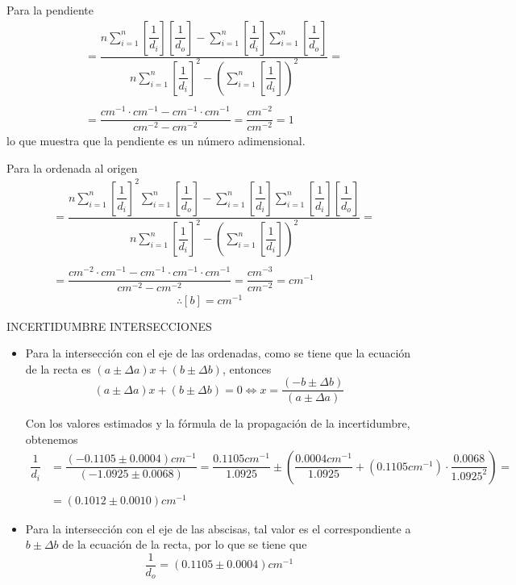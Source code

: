 \documentclass[a4paper, 10pt]{article}
\begin{document}
	Para la pendiente
	\begin{align*}
		[a]&=\dfrac{n\displaystyle\sum_{i=1}^{n}\left[\dfrac{1}{d_i}\right]\left[\dfrac{1}{d_o}\right]-\displaystyle\sum_{i=1}^{n}\left[\dfrac{1}{d_i}\right]\displaystyle\sum_{i=1}^{n}\left[\dfrac{1}{d_o}\right]}{n\displaystyle\sum_{i=1}^{n}\left[\dfrac{1}{d_i}\right]^2-\left(\displaystyle\sum_{i=1}^{n}\left[\dfrac{1}{d_i}\right]\right)^2}=\\\\
		&=\dfrac{cm^{-1}\cdot cm^{-1}-cm^{-1}\cdot cm^{-1}}{cm^{-2}-cm^{-2}}=\dfrac{cm^{-2}}{cm^{-2}}=1
	\end{align*}
	lo que muestra que la pendiente es un número adimensional. 
	
	Para la ordenada al origen
	\begin{align*}
		[b]&=\dfrac{n\displaystyle\sum_{i=1}^{n}\left[\dfrac{1}{d_i}\right]^2\displaystyle\sum_{i=1}^{n}\left[\dfrac{1}{d_o}\right]-\displaystyle\sum_{i=1}^{n}\left[\dfrac{1}{d_i}\right]\displaystyle\sum_{i=1}^{n}\left[\dfrac{1}{d_i}\right]\left[\dfrac{1}{d_o}\right]}{n\displaystyle\sum_{i=1}^{n}\left[\dfrac{1}{d_i}\right]^2-\left(\displaystyle\sum_{i=1}^{n}\left[\dfrac{1}{d_i}\right]\right)^2}=\\\\
		&=\dfrac{cm^{-2}\cdot cm^{-1}-cm^{-1}\cdot cm^{-1}\cdot cm^{-1}}{cm^{-2}-cm^{-2}}=\dfrac{cm^{-3}}{cm^{-2}}=cm^{-1}
	\end{align*}
	$$\therefore [b]= cm^{-1}$$
	
	
	INCERTIDUMBRE INTERSECCIONES
	
	\begin{itemize}
		\item Para la intersección con el eje de las ordenadas, como se tiene que la ecuación de la recta es $(a\pm \Delta a)x+(b\pm \Delta b)$, entonces
		$$(a\pm \Delta a)x+(b\pm \Delta b)=0\Longleftrightarrow x=\dfrac{(-b\pm \Delta b)}{(a\pm \Delta a)} $$ 
		
		Con los valores estimados y la fórmula de la propagación de la incertidumbre, obtenemos
		\begin{align*}
			\dfrac{1}{d_i}&=\dfrac{(-0.1105\pm 0.0004) cm^{-1}}{(-1.0925\pm 0.0068)}=
			\dfrac{0.1105 cm^{-1}}{1.0925}\pm\left(\dfrac{0.0004 cm^{-1}}{1.0925}+(0.1105 cm^{-1})\cdot \dfrac{0.0068}{1.0925^2}\right)=\\\\
			&=(0.1012\pm 0.0010) cm^{-1}
		\end{align*}
	
		\item Para la intersección con el eje de las abscisas, tal valor es el correspondiente a $b\pm \Delta b$ de la ecuación de la recta, por lo que se tiene que
		$$\dfrac{1}{d_o}=(0.1105\pm 0.0004) cm^{-1} $$
	\end{itemize}
	
\end{document}
